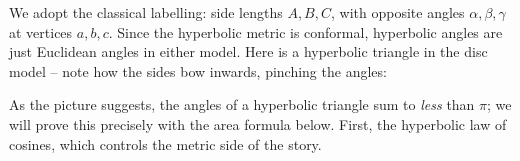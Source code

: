 \documentclass[a4paper]{scrartcl}
\begin{document}
We adopt the classical labelling: side lengths $A, B, C$, with opposite angles $\alpha, \beta, \gamma$ at vertices $a, b, c$. Since the hyperbolic metric is conformal, hyperbolic angles are just Euclidean angles in either model. Here is a hyperbolic triangle in the disc model -- note how the sides bow inwards, pinching the angles:
\begin{center}
\end{center}
As the picture suggests, the angles of a hyperbolic triangle sum to \emph{less} than $\pi$; we will prove this precisely with the area formula below. First, the hyperbolic law of cosines, which controls the metric side of the story.
\end{document}
